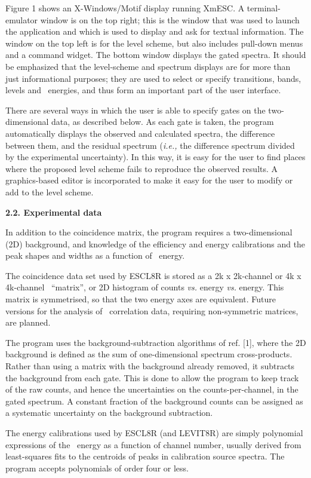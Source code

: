 Figure 1 shows an X-Windows/Motif display running XmESC. A terminal-emulator
window is on the top right; this is the window that was used to launch the
application and which is used to display and ask for textual information. The
window on the top left is for the level scheme, but also includes pull-down
menus and a command widget. The bottom window displays the gated spectra. It
should be emphasized that the level-scheme and spectrum displays are for more
than just informational purposes; they are used to select or specify
transitions, bands, levels and \ghray\ energies, and thus form an important
part of the user interface.

There are several ways in which the user is able to specify gates on the
two-dimensional data, as described below. As each gate is taken, the program
automatically displays the observed and calculated spectra, the difference
between them, and the residual spectrum ({\em i.e.,} the difference spectrum
divided by the experimental uncertainty). In this way, it is easy for the user
to find places where the proposed level scheme fails to reproduce the observed
results. A graphics-based editor is incorporated to make it easy for the user
to modify or add to the level scheme.

\noindent
{\bf 2.2. Experimental data}

In addition to the coincidence matrix, the program requires a two-dimensional
(2D) background, and knowledge of the efficiency and energy calibrations and
the peak shapes and widths as a function of \ghray\ energy.

The coincidence data set used by ESCL8R is stored as a 2k x 2k-channel or 4k x
4k-channel \ghg\ ``matrix'', or 2D histogram of counts {\em vs.} energy {\em
vs.} energy. This matrix is symmetrised, so that the two energy axes are
equivalent. Future versions for the analysis of \ghg\ correlation data,
requiring non-symmetric matrices, are planned.

The program uses the background-subtraction algorithms of ref. [1], where the
2D background is defined as the sum of one-dimensional spectrum cross-products.
Rather than using a matrix with the background already removed, it subtracts
the background from each gate. This is done to allow the program to keep track
of the raw counts, and hence the uncertainties on the counts-per-channel, in
the gated spectrum.
A constant fraction of the background counts can be assigned as a systematic
uncertainty on the background subtraction.

The energy calibrations used by ESCL8R (and LEVIT8R) are simply polynomial
expressions of the \ghray\ energy as a function of channel number, usually
derived from least-squares fits to the centroids of peaks in calibration source
spectra. The program accepts polynomials of order four or less.

